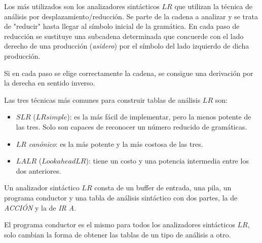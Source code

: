 Los más utilizados son los  analizadores sintácticos $LR$ que utilizan la técnica de análisis por desplazamiento/reducción. Se parte de la cadena a analizar y se trata de "reducir" hasta llegar al símbolo inicial de la gramática.
En cada paso de reducción se sustituye una subcadena determinada que concuerde con el lado derecho de una producción (\textit{asidero}) por el símbolo del lado izquierdo de dicha producción.

Si en cada paso se elige correctamente la cadena, se consigue una derivación por la derecha en sentido inverso.


Las tres técnicas más comunes para construir tablas de análisis $LR$ son:
\begin{itemize}

\item $SLR$ ($LR simple$): es la más fácil de implementar, pero la menos potente de las tres. Solo son capaces de reconocer un número reducido de gramáticas.

\item $LR$ \textit{canónico}: es la más potente y la más costosa de las tres.

\item $LALR$ ($Lookahead LR$): tiene un costo y una potencia intermedia entre los dos anteriores.

\end{itemize}



Un analizador sintáctico $LR$  consta de un buffer de  entrada, una pila, un programa conductor y una tabla de análisis sintáctico con dos partes, la de \textit{ACCIÓN} y la de \textit{IR A}. 

El programa conductor es el mismo para todos los analizadores sintácticos $LR$, solo cambian la forma de obtener las tablas de un tipo de análisis a otro.

